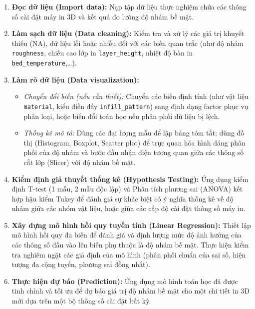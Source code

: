 \begin{enumerate}
    \item \textbf{Đọc dữ liệu (Import data):} Nạp tập dữ liệu thực nghiệm chứa các thông số cài đặt máy in 3D và kết quả đo lường độ nhám bề mặt.
    
    \item \textbf{Làm sạch dữ liệu (Data cleaning):} Kiểm tra và xử lý các giá trị khuyết thiếu (NA), dữ liệu lỗi hoặc nhiễu đối với các biến quan trắc (như độ nhám \texttt{roughness}, chiều cao lớp in \texttt{layer\_height}, nhiệt độ bàn in \texttt{bed\_temperature},\dots).
    
    \item \textbf{Làm rõ dữ liệu (Data visualization):}
    \begin{itemize}
        \item \textit{Chuyển đổi biến (nếu cần thiết):} Chuyển các biến định tính (như vật liệu \texttt{material}, kiểu điền đầy \texttt{infill\_pattern}) sang định dạng factor phục vụ phân loại, hoặc biến đổi toán học nếu phân phối dữ liệu bị lệch.
        \item \textit{Thống kê mô tả:} Dùng các đại lượng mẫu để lập bảng tóm tắt; dùng đồ thị (Histogram, Boxplot, Scatter plot) để trực quan hóa hình dáng phân phối của độ nhám và bước đầu nhận diện tương quan giữa các thông số cắt lớp (Slicer) với độ nhám bề mặt.
    \end{itemize}
    
    \item \textbf{Kiểm định giả thuyết thống kê (Hypothesis Testing):} Ứng dụng kiểm định T-test (1 mẫu, 2 mẫu độc lập) và Phân tích phương sai (ANOVA) kết hợp hậu kiểm Tukey để đánh giá sự khác biệt có ý nghĩa thống kê về độ nhám giữa các nhóm vật liệu, hoặc giữa các cấp độ cài đặt thông số máy in.
    
    \item \textbf{Xây dựng mô hình hồi quy tuyến tính (Linear Regression):} Thiết lập mô hình hồi quy đa biến để đánh giá và định lượng mức độ ảnh hưởng của các thông số đầu vào lên biến phụ thuộc là độ nhám bề mặt. Thực hiện kiểm tra nghiêm ngặt các giả định của mô hình (phân phối chuẩn của sai số, hiện tượng đa cộng tuyến, phương sai đồng nhất).
    
    \item \textbf{Thực hiện dự báo (Prediction):} Ứng dụng mô hình toán học đã được tinh chỉnh và tối ưu để dự báo giá trị độ nhám bề mặt cho một chi tiết in 3D mới dựa trên một bộ thông số cài đặt bất kỳ.
\end{enumerate}
\newpage